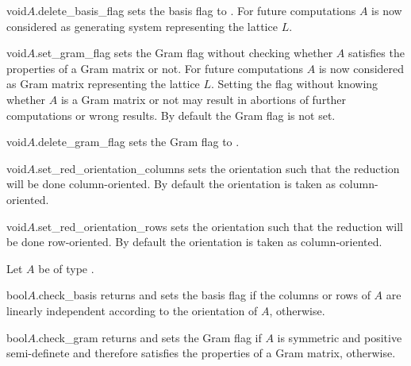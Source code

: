\begin{fcode}{void}{$A$.delete_basis_flag}{}
  sets the basis flag to \FALSE.  For future computations $A$ is now considered as generating
  system representing the lattice $L$.
\end{fcode}

\begin{fcode}{void}{$A$.set_gram_flag}{}
  sets the Gram flag without checking whether $A$ satisfies the properties of a Gram matrix or
  not.  For future computations $A$ is now considered as Gram matrix representing the lattice
  $L$.  Setting the flag without knowing whether $A$ is a Gram matrix or not may result in
  abortions of further computations or wrong results.  By default the Gram flag is not set.
\end{fcode}

\begin{fcode}{void}{$A$.delete_gram_flag}{}
  sets the Gram flag to \FALSE.
\end{fcode}

\begin{fcode}{void}{$A$.set_red_orientation_columns}{}
  sets the orientation such that the reduction will be done column-oriented.  By default the
  orientation is taken as column-oriented.
\end{fcode}

\begin{fcode}{void}{$A$.set_red_orientation_rows}{}
  sets the orientation such that the reduction will be done row-oriented.  By default the
  orientation is taken as column-oriented.
\end{fcode}



\BASIC

Let $A$ be of type .

\begin{fcode}{bool}{$A$.check_basis}{}
  returns \TRUE and sets the basis flag if the columns or rows of $A$ are linearly independent
  according to the orientation of $A$, \FALSE otherwise.
\end{fcode}

\begin{fcode}{bool}{$A$.check_gram}{}
  returns \TRUE and sets the Gram flag if $A$ is symmetric and positive semi-definete and
  therefore satisfies the properties of a Gram matrix, \FALSE otherwise.
\end{fcode}

